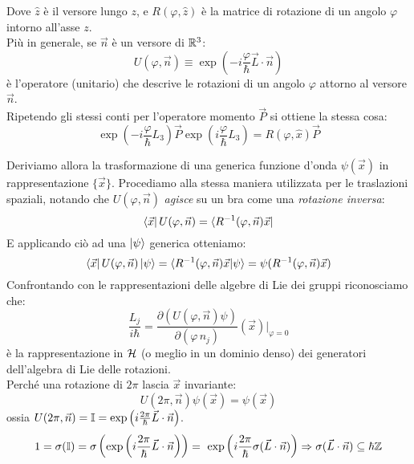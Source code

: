 \documentclass[../../FisicaTeorica.tex]{subfiles}
\begin{document}
Dove $\hat{z}$ è il versore lungo $z$, e $R(\varphi, \hat{z})$ è la matrice di rotazione di un angolo $\varphi$ intorno all'asse $z$.\\
Più in generale, se $\vec{n}$ è un versore di $\mathbb{R}^3$:
\[
U(\varphi, \vec{n})\equiv \exp\left({-i\frac{\varphi}{\hbar} \vec{L}\cdot \vec{n}}\right)
\]
è l'operatore (unitario) che descrive le rotazioni di un angolo $\varphi$ attorno al versore $\vec{n}$.\\

Ripetendo gli stessi conti per l'operatore momento $\vec{P}$ si ottiene la stessa cosa:
\[
\exp\left(-i\frac{\varphi}{\hbar}L_3\right)\vec{P}\exp\left(i\frac{\varphi}{\hbar}L_3\right)=R(\varphi, \hat{x})\vec{P}
\]

Deriviamo allora la trasformazione di una generica funzione d'onda $\psi(\vec{x})$ in rappresentazione $\{\vec{x}\}$. Procediamo alla stessa maniera utilizzata per le traslazioni spaziali, notando che $U(\varphi,\vec{n})$ \textit{agisce}  su un bra come una \textit{rotazione inversa}:
\[
\bra{\vec{x}} U(\varphi, \vec{n}) = \bra{R^{-1}(\varphi, \vec{n}) \vec{x}}
\]
E applicando ciò ad una $\ket{\psi}$ generica otteniamo:
\[
\bra{\vec{x}}U(\varphi, \vec{n})\ket{\psi}=\braket{R^{-1}(\varphi, \vec{n})\vec{x}|\psi}=\psi(R^{-1}(\varphi, \vec{n}) \vec{x})
\]
Confrontando con le rappresentazioni delle algebre di Lie dei gruppi riconosciamo che:
\[
\frac{L_j}{i\hbar} = \frac{\partial(U(\varphi, \vec{n})\psi)}{\partial(\varphi \,n_j)}(\vec{x})\Big|_{\varphi=0}
\] %
è la rappresentazione in $\mathcal{H}$ (o meglio in un dominio denso) dei generatori dell'algebra di Lie delle rotazioni. %
\\Perché una rotazione di $2\pi$ lascia $\vec{x}$ invariante:
\[
U(2\pi, \vec{n})\psi(\vec{x})=\psi(\vec{x})
\]
ossia $U(2\pi, \vec{n})=\mathbb{I} = \exp\left(i\frac{2\pi}{\hbar}\vec{L}\cdot \vec{n}\right)$.
\[
1=\sigma(\bb{I}) = \sigma\left(\exp\left(i\frac{2\pi}{\hbar}\vec{L}\cdot \vec{n}\right)\right) =\ \exp\left(i\frac{2\pi}{\hbar}\sigma(\vec{L}\cdot \vec{n})\right)\Rightarrow \sigma(\vec{L}\cdot \vec{n}) \subseteq \hbar \bb{Z}
\]
\end{document}
